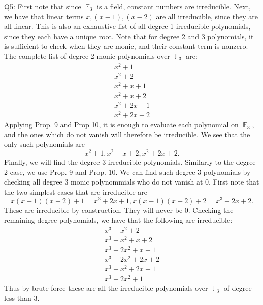 \documentclass[letterpaper]{article}
\DeclareMathOperator{\F}{\mathbb{F}}
\begin{document}
 \noindent Q5: First note that since $\F_3$ is a field, constant numbers are irreducible. 
Next, we have that linear terms $x,(x-1),(x-2)$ are all irreducible, since they are all linear. This is also an exhaustive list of all degree 1 irreducible polynomials,
since they each have a unique root. Note that for degree 2 and 3 polynomials, it is sufficient to check when they are monic, and their constant term is nonzero. 
The complete list of degree 2 monic polynomials over $\F_3$ are: 
\begin{align*}
    x^2+ 1\\ x^2+2 \\ x^2+x+1 \\ x^2+x+2\\ x^2+2x+1 \\ x^2+2x+2
\end{align*}
Applying Prop. 9 and Prop 10, it is enough to evaluate each polynomial on $\F_3$, and the ones which do not vanish
will therefore be irreducible. We see that the only such polynomials are $$x^2+1, x^2+x+2, x^2+2x+2.$$ 
Finally, we will find the degree $3$ irreducible polynomials. Similarly to the degree 2 case, we use Prop. 9 and Prop. 10. 
We can find such degree $3$ polynomials by checking all degree 3 monic polynommials who do not vanish at 0. 
First note that the two simplest cases that are irreducible are $$x(x-1)(x-2)+1 = x^3+2x+1, x(x-1)(x-2)+2= x^3+2x+2.$$ 
These are irreducible by construction. They will never be 0.
Checking the remaining degree polynomials, we have that the following are irreducible: 
\begin{align*} x^3+x^2+2 \\ x^3+x^2+x+2 \\ x^3+2x^2+x+1 \\x^3+2x^2+2x+2 \\ x^3+x^2+2x+1 \\ x^3+2x^2+1   \end{align*}
Thus by brute force these are all the irreducible polynomials over $\F_3$ of degree less than 3. 
\end{document}
